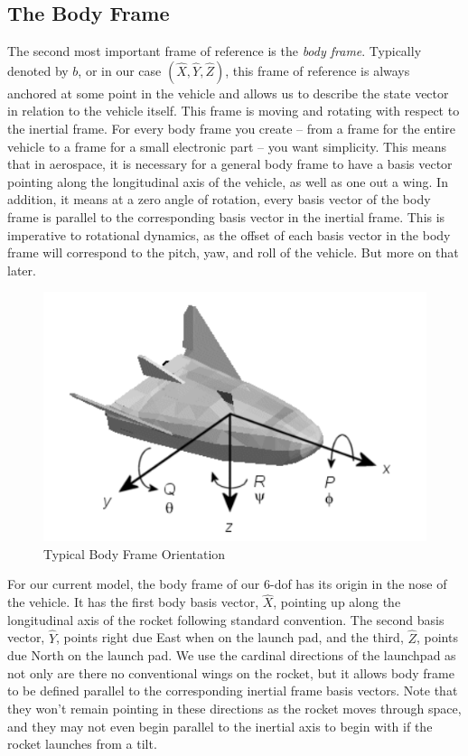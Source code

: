 \documentclass[12pt]{report}
\begin{document}
\subsection{The Body Frame}
The second most important frame of reference is the \textit{body frame}. Typically denoted by $b$, or in our case $(\hat{X},\hat{Y},\hat{Z})$, this frame of reference is always anchored at some point in the vehicle and allows us to describe the \gls{state vector} in relation to the vehicle itself. This frame is moving and rotating with respect to the inertial frame. For every body frame you create – from a frame for the entire vehicle to a frame for a small electronic part – you want simplicity. This means that in aerospace, it is necessary for a general body frame to have a basis vector pointing along the longitudinal axis of the vehicle, as well as one out a wing. In addition, it means at a zero angle of rotation, every basis vector of the body frame is parallel to the corresponding basis vector in the inertial frame. This is imperative to rotational dynamics, as the offset of each basis vector in the body frame will correspond to the pitch, yaw, and roll of the vehicle. But more on that later.

\begin{figure}[H]
\centering
    
\includegraphics[width=\linewidth]{BodyFrame.png}
    \caption{Typical Body Frame Orientation}
    \label{fig:BodyFrameTypical}
\end{figure}

For our current model, the body frame of our 6-\gls{dof} has its origin in the nose of the vehicle. It has the first body basis vector, $\hat{X}$, pointing up along the longitudinal axis of the rocket following standard convention. The second basis vector, $\hat{Y}$, points right due East when on the launch pad, and the third, $\hat{Z}$, points due North on the launch pad. We use the cardinal directions of the launchpad as not only are there no conventional wings on the rocket, but it allows body frame to be defined parallel to the corresponding inertial frame basis vectors. Note that they won’t remain pointing in these directions as the rocket moves through space, and they may not even begin parallel to the inertial axis to begin with if the rocket launches from a tilt.
\end{document}
